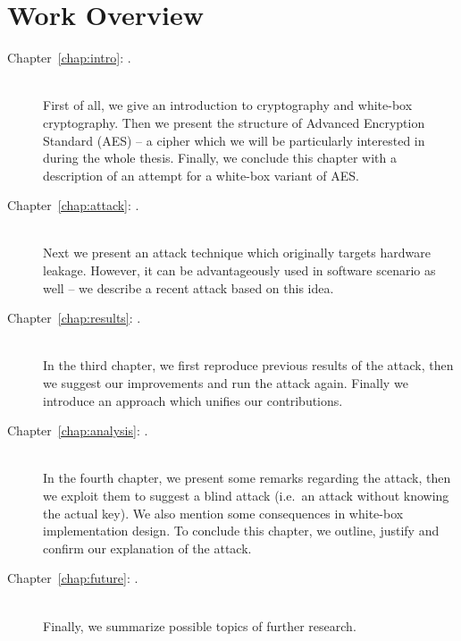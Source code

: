 \section*{Work Overview}
	\begin{description}
		\item[Chapter~\ref{chap:intro}: .] ~ \\
			First of all, we give an introduction to cryptography and white-box cryptography. Then we present the structure of Advanced Encryption Standard (AES) -- a cipher which we will be particularly interested in during the whole thesis. Finally, we conclude this chapter with a description of an attempt for a white-box variant of AES.
		\item[Chapter~\ref{chap:attack}: .] ~ \\
			Next we present an attack technique which originally targets hardware leakage. However, it can be advantageously used in software scenario as well -- we describe a recent attack based on this idea.
		\item[Chapter~\ref{chap:results}: .] ~ \\
			In the third chapter, we first reproduce previous results of the attack, then we suggest our improvements and run the attack again. Finally we introduce an approach which unifies our contributions.
		\item[Chapter~\ref{chap:analysis}: .] ~ \\
			In the fourth chapter, we present some remarks regarding the attack, then we exploit them to suggest a blind attack (i.e.\ an attack without knowing the actual key). We also mention some consequences in white-box implementation design. To conclude this chapter, we outline, justify and confirm our explanation of the attack.
		\item[Chapter~\ref{chap:future}: .] ~ \\
			Finally, we summarize possible topics of further research.
	\end{description}
